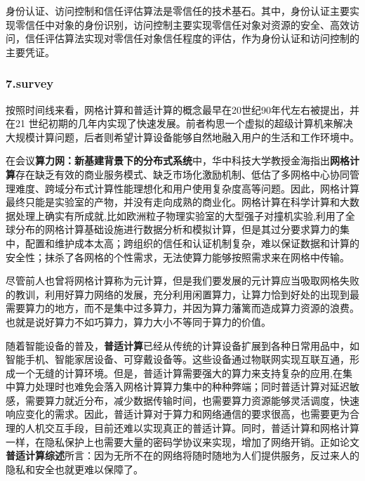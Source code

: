 \documentclass[a4paper,twoside]{scrbook}
\begin{document}
\begin{CJK}{UTF8}{gbsn}
身份认证、访问控制和信任评估算法是零信任的技术基石。其中，身份认证主要实现零信任中对象的身份识别，访问控制主要实现零信任对象对资源的安全、高效访问，信任评估算法实现对零信任对象信任程度的评估，作为身份认证和访问控制的主要凭证。
\subsubsection{7.survey}
按照时间线来看，网格计算和普适计算的概念最早在20世纪90年代左右被提出，并在21 世纪初期的几年内实现了快速发展。前者构思一个虚拟的超级计算机来解决大规模计算问题，后者则希望计算设备能够自然地融入用户的生活和工作环境中。

在会议\textbf{算力网：新基建背景下的分布式系统}中，华中科技大学教授金海指出\textbf{网格计算}存在缺乏有效的商业服务模式、缺乏市场化激励机制、低估了多网格中心协同管理难度、跨域分布式计算性能理想化和用户使用复杂度高等问题。因此，网格计算最终只能是实验室的产物，并没有走向成熟的商业化。网格计算在科学计算和大数据处理上确实有所成就,比如欧洲粒子物理实验室的大型强子对撞机实验,利用了全球分布的网格计算基础设施进行数据分析和模拟计算，但是其过分要求算力的集中，配置和维护成本太高；跨组织的信任和认证机制复杂，难以保证数据和计算的安全性；抹杀了各网格的个性需求，无法使算力能够按照需求来在网格中传输。

尽管前人也曾将网格计算称为元计算，但是我们要发展的元计算应当吸取网格失败的教训，利用好算力网络的发展，充分利用闲置算力，让算力恰到好处的出现到最需要算力的地方，而不是集中过多算力，并因为算力藩篱而造成算力资源的浪费。也就是说好算力不如巧算力，算力大小不等同于算力的价值。

随着智能设备的普及，\textbf{普适计算}已经从传统的计算设备扩展到各种日常用品中，如智能手机、智能家居设备、可穿戴设备等。这些设备通过物联网实现互联互通，形成一个无缝的计算环境。但是，普适计算需要强大的算力来支持复杂的应用,在集中算力处理时也难免会落入网格计算算力集中的种种弊端；同时普适计算对延迟敏感，需要算力就近分布，减少数据传输时间，也需要算力资源能够灵活调度，快速响应变化的需求。因此，普适计算对于算力和网络通信的要求很高，也需要更为合理的人机交互手段，目前还难以实现真正的普适计算。同时，普适计算和网格计算一样，在隐私保护上也需要大量的密码学协议来实现，增加了网络开销。正如论文\textbf{普适计算综述}所言：因为无所不在的网络将随时随地为人们提供服务，反过来人的隐私和安全也就更难以保障了。


\end{CJK}
\end{document}
